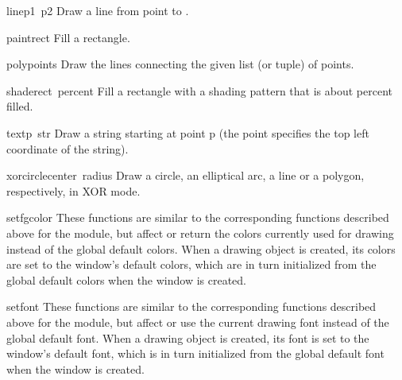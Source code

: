 \begin{funcdesc}{line}{p1\, p2}
Draw a line from point
to
.
\end{funcdesc}

\begin{funcdesc}{paint}{rect}
Fill a rectangle.
\end{funcdesc}

\begin{funcdesc}{poly}{points}
Draw the lines connecting the given list (or tuple) of points.
\end{funcdesc}

\begin{funcdesc}{shade}{rect\, percent}
Fill a rectangle with a shading pattern that is about
percent filled.
\end{funcdesc}

\begin{funcdesc}{text}{p\, str}
Draw a string starting at point p (the point specifies the
top left coordinate of the string).
\end{funcdesc}

\begin{funcdesc}{xorcircle}{center\, radius}
Draw a circle, an elliptical arc, a line or a polygon, respectively,
in XOR mode.
\end{funcdesc}

\begin{funcdesc}{setfgcolor}{}
These functions are similar to the corresponding functions described
above for the
module, but affect or return the colors currently used for drawing
instead of the global default colors.
When a drawing object is created, its colors are set to the window's
default colors, which are in turn initialized from the global default
colors when the window is created.
\end{funcdesc}

\begin{funcdesc}{setfont}{}
These functions are similar to the corresponding functions described
above for the
module, but affect or use the current drawing font instead of
the global default font.
When a drawing object is created, its font is set to the window's
default font, which is in turn initialized from the global default
font when the window is created.
\end{funcdesc}

